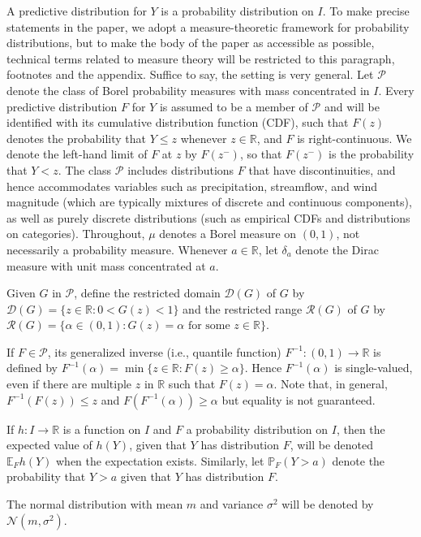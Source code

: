 \documentclass[10pt]{article} %
\theoremstyle{theorem}
\theoremstyle{definition}
\newcommand{\RRR}{\mathbb{R}}
\newcommand{\EEE}{\mathbb{E}}
\newcommand{\PPP}{\mathbb{P}}
\newcommand{\cN}{\mathcal{N}}
\begin{document}
A predictive distribution for $Y$ is a probability distribution on $I$. To make precise statements in the paper, we adopt a measure-theoretic framework for probability distributions, but to make the body of the paper as accessible as possible, technical terms related to measure theory will be restricted to this paragraph, footnotes and the appendix. Suffice to say, the setting is very general. Let $\mathcal{P}$ denote the class of Borel probability measures with mass concentrated in $I$. Every predictive distribution $F$ for $Y$ is assumed to be a member of $\mathcal{P}$ and will be identified with its cumulative distribution function (CDF), such that $F(z)$ denotes the probability that $Y\leq z$ whenever $z\in \RRR$, and $F$ is right-continuous. We denote the left-hand limit of $F$ at $z$ by $F(z^-)$, so that $F(z^-)$ is the probability that $Y<z$. The class $\mathcal{P}$ includes distributions $F$ that have discontinuities, and hence accommodates variables such as precipitation, streamflow, and wind magnitude (which are typically mixtures of discrete and continuous components), as well as purely discrete distributions (such as empirical CDFs and distributions on categories). Throughout, $\mu$ denotes a Borel measure on $(0,1)$, not necessarily a probability measure. Whenever $a\in\RRR$, let $\delta_a$ denote the Dirac measure with unit mass concentrated at $a$.

Given $G$ in $\mathcal{P}$, define the restricted domain $\mathcal{D}(G)$ of $G$ by $\mathcal{D}(G)=\{z\in \RRR:0<G(z)<1\}$ and the restricted range $\mathcal{R}(G)$ of $G$ by $\mathcal{R}(G)=\{\alpha\in (0,1):G(z)=\alpha\text{ for some } z\in\RRR\}$.

If $F\in\mathcal{P}$, its generalized inverse (i.e., quantile function) $F^{-1}:(0,1)\to \RRR$ is defined by $F^{-1}(\alpha)=\min\{z\in \RRR: F(z)\geq \alpha\}$. Hence $F^{-1}(\alpha)$ is single-valued, even if there are multiple $z$ in $\RRR$ such that $F(z)=\alpha$. Note that, in general, $F^{-1}(F(z)) \leq z$ and $F(F^{-1}(\alpha)) \geq \alpha$ but equality is not guaranteed.

If $h:I\to\RRR$ is a function on $I$ and $F$ a probability distribution on $I$, then the expected value of $h(Y)$, given that $Y$ has distribution $F$, will be denoted $\EEE_F h(Y)$ when the expectation exists. Similarly, let $\PPP_F(Y>a)$ denote the probability that $Y>a$ given that $Y$ has distribution $F$.

The normal distribution with mean $m$ and variance $\sigma^2$ will be denoted by $\cN(m, \sigma^2)$.
\end{document}
